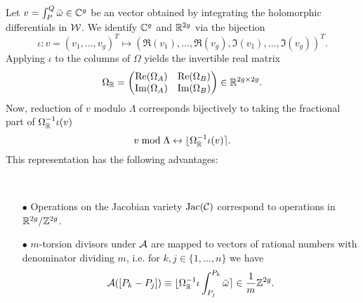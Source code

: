 \documentclass[main.tex]{subfiles}
\begin{document}
   Let $v = \int_P^Q \bar{\omega} \in \mathbb{C}^g$ be an vector obtained by integrating the holomorphic differentials in
   $\mathcal{W}$.
   We identify $\mathbb{C}^g$ and $\mathbb{R}^{2g}$ via the bijection
   \begin{equation}
    \iota: v = (v_1,\dots,v_g)^T \mapsto (\Re(v_1),\dots,\Re(v_g),\Im(v_1),\dots,\Im(v_g))^T.
   \end{equation}
    Applying $\iota$ to the columns of $\Omega$ yields the invertible real matrix
   \begin{equation}
    \Omega_{\mathbb{R}} = 
   \begin{pmatrix}
     \operatorname{Re}(\Omega_A) & \operatorname{Re}(\Omega_B) \\
     \operatorname{Im}(\Omega_A) & \operatorname{Im}(\Omega_B)
    \end{pmatrix} \in \mathbb{R}^{2g \times 2g}.
   \end{equation}
   Now, reduction of $v$ modulo $\Lambda$ corresponds bijectively to taking the fractional part of $\Omega_{\mathbb{R}}^{-1}\iota(v)$
   \begin{equation}
    v \bmod \Lambda \leftrightarrow \lfloor \Omega_{\mathbb{R}}^{-1}\iota(v) \rceil.
   \end{equation}
   This representation has the following advantages:
   \begin{rmk} \
    \begin{itemize}
     \item[$\bullet$] Operations on the Jacobian variety $\operatorname{Jac}(\mathcal{C})$ correspond to operations in $\mathbb{R}^{2g}/\mathbb{Z}^{2g}$.
     \item[$\bullet$] $m$-torsion divisors under $\mathcal{A}$ are mapped to vectors of rational numbers with 
     denominator dividing $m$, i.e. for $k,j \in \{ 1,\dots,n \}$ we have
     \begin{equation}
      \mathcal{A}([P_k - P_j]) \equiv \lfloor \Omega_{\mathbb{R}}^{-1} \iota \int_{P_j}^{P_k} \bar{\omega}
      \rceil \in \frac{1}m\mathbb{Z}^{2g}.
     \end{equation}
    \end{itemize}
   \end{rmk}

\biblio
\end{document}
